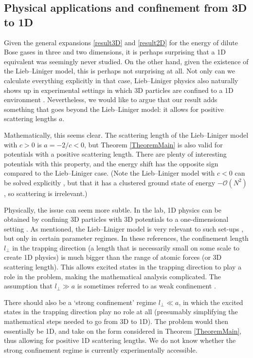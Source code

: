 \documentclass[a4paper,11pt]{article}
\numberwithin{equation}{section}
\begin{document}
\subsection{Physical applications and confinement from 3D to 1D}
\label{SecConfinement}
Given the general expansions \eqref{result3D} and \eqref{result2D} for the energy of dilute Bose gases in three and two dimensions, it is perhaps surprising that a 1D equivalent was seemingly never studied. On the other hand, given the existence of the Lieb--Liniger model, this is perhaps not surprising at all. Not only can we calculate everything explicitly in that case, Lieb--Liniger physics also naturally shows up in experimental settings in which 3D particles are confined to a 1D environment \cite{olshanii1998atomic,lieb2003one,lieb2004one,seiringer2008lieb}. Nevertheless, we would like to argue that our result adds something that goes beyond the Lieb--Liniger model: it allows for positive scattering lengths $a$.

Mathematically, this seems clear. The scattering length of the Lieb--Liniger model with $c>0$ is $a=-2/c<0$, but Theorem \ref{TheoremMain} is also valid for potentials with a positive scattering length. There are plenty of interesting potentials with this property, and the energy shift has the opposite sign compared to the Lieb--Liniger case. (Note the Lieb--Liniger model with $c<0$ can be solved explicitly \cite{calabrese2007correlation}, but that it has a clustered ground state of energy $-\mathcal{O}(N^2)$ \cite{lieb1963exact,mcguire1964study}, so scattering is irrelevant.)

Physically, the issue can seem more subtle. In the lab, 1D physics can be obtained by confining 3D particles with 3D potentials to a one-dimensional setting \cite{schreck2001quasipure,gorlitz2001realization,greiner2001exploring,moritz2003exciting}. As mentioned, the Lieb--Liniger model is very relevant to such set-ups \cite{olshanii1998atomic,lieb2003one,lieb2004one,seiringer2008lieb}, but only in certain parameter regimes. In these references, the confinement length $l_\perp$ in the trapping direction (a length that is necessarily small on some scale to create 1D physics) is much bigger than the range of atomic forces (or 3D scattering length). This allows excited states in the trapping direction to play a role in the problem, making the mathematical analysis complicated. The assumption that $l_\perp\gg a$ is sometimes referred to as weak confinement \cite{bloch2008many}. 

There should also be a `strong confinement' regime $l_\perp\ll a$, in which the excited states in the trapping direction play no role at all (presumably simplifying the mathematical steps needed to go from 3D to 1D). The problem would then essentially be 1D, and take on the form considered in Theorem \ref{TheoremMain}, thus allowing for positive 1D scattering lengths. We do not know whether the strong confinement regime is currently experimentally accessible. 
\end{document}
